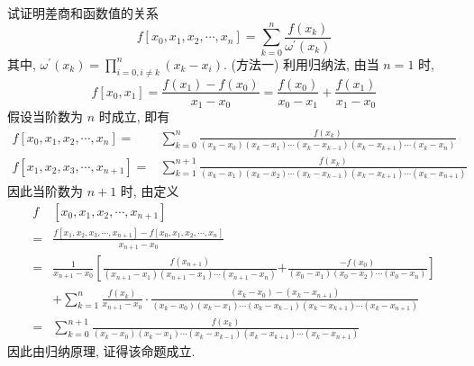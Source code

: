   \begin{tcolorbox}[enhanced,colback=10,colframe=9,breakable,coltitle=green!25!black,title=2024]
 试证明差商和函数值的关系
$$
f\left[x_{0}, x_{1}, x_{2}, \cdots, x_{n}\right]=\sum_{k=0}^{n} \frac{f\left(x_{k}\right)}{\omega^{\prime}\left(x_{k}\right)}
$$
其中, $ \omega^{\prime}\left(x_{k}\right)=\prod_{i=0, i \neq k}^{n}\left(x_{k}-x_{i}\right) $.
\tcblower
 (方法一) 利用归纳法, 由当 $ n=1 $ 时,
$$
f\left[x_{0}, x_{1}\right]=\frac{f\left(x_{1}\right)-f\left(x_{0}\right)}{x_{1}-x_{0}}=\frac{f\left(x_{0}\right)}{x_{0}-x_{1}}+\frac{f\left(x_{1}\right)}{x_{1}-x_{0}}
$$
假设当阶数为 $ n $ 时成立, 即有
$$
\begin{aligned}
 f\left[x_{0}, x_{1}, x_{2}, \cdots, x_{n}\right] 
= & \sum_{k=0}^{n} \frac{f\left(x_{k}\right)}{\left(x_{k}-x_{0}\right)\left(x_{k}-x_{1}\right) \cdots\left(x_{k}-x_{k-1}\right)\left(x_{k}-x_{k+1}\right) \cdots\left(x_{k}-x_{n}\right)} \\
 f\left[x_{1}, x_{2}, x_{3}, \cdots, x_{n+1}\right] 
= & \sum_{k=1}^{n+1} \frac{f\left(x_{k}\right)}{\left(x_{k}-x_{1}\right)\left(x_{k}-x_{2}\right) \cdots\left(x_{k}-x_{k-1}\right)\left(x_{k}-x_{k+1}\right) \cdots\left(x_{k}-x_{n+1}\right)}
\end{aligned}
$$
因此当阶数为 $ n+1 $ 时, 由定义
$$
\begin{aligned}
f&\left[x_{0}, x_{1}, x_{2}, \cdots, x_{n+1}\right]\\
= & \frac{f\left[x_{1}, x_{2}, x_{3}, \cdots, x_{n+1}\right]-f\left[x_{0}, x_{1}, x_{2}, \cdots, x_{n}\right]}{x_{n+1}-x_{0}} \\
= & \frac{1}{x_{n+1}-x_{0}}\left[\frac{f\left(x_{n+1}\right)}{\left(x_{n+1}-x_{1}\right)\left(x_{n+1}-x_{1}\right) \cdots\left(x_{n+1}-x_{n}\right)}\right.  \left.+\frac{-f\left(x_{0}\right)}{\left(x_{0}-x_{1}\right)\left(x_{0}-x_{2}\right) \cdots\left(x_{0}-x_{n}\right)}\right] \\
& +\sum_{k=1}^{n} \frac{f\left(x_{k}\right)}{x_{n+1}-x_{0}} \cdot \frac{\left(x_{k}-x_{0}\right)-\left(x_{k}-x_{n+1}\right)}{\left(x_{k}-x_{0}\right)\left(x_{k}-x_{1}\right) \cdots\left(x_{k}-x_{k-1}\right)\left(x_{k}-x_{k+1}\right) \cdots\left(x_{k}-x_{n+1}\right)} \\
= & \sum_{k=0}^{n+1} \frac{f\left(x_{k}\right)}{\left(x_{k}-x_{0}\right)\left(x_{k}-x_{1}\right) \cdots\left(x_{k}-x_{k-1}\right)\left(x_{k}-x_{k+1}\right) \cdots\left(x_{k}-x_{n+1}\right)}
\end{aligned}
$$
因此由归纳原理, 证得该命题成立.


\end{tcolorbox}
